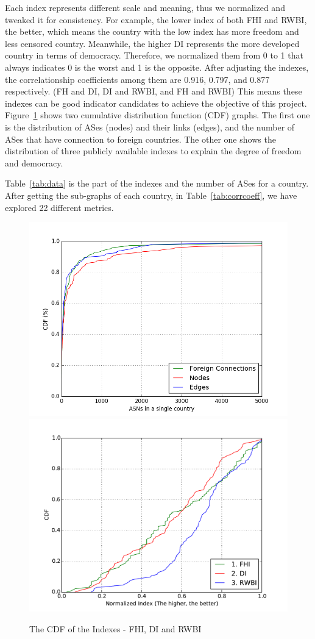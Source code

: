 \documentclass{article}
\begin{document}
\noindent 
Each index represents different scale and meaning, thus we normalized and
tweaked it for consistency. For example, the lower index of both FHI and RWBI,
the better, which means the country with the low index has more freedom and less
censored country. Meanwhile, the higher DI represents the more developed country
in terms of democracy. Therefore, we normalized them from 0 to 1 that always
indicates 0 is the worst and 1 is the opposite. After adjusting the indexes, the
correlationship coefficients among them are 0.916, 0.797, and 0.877
respectively. (FH and DI, DI and RWBI, and FH and RWBI) This means these indexes
can be good indicator candidates to achieve the objective of this project.
Figure~\ref{fig:index_cdf} shows two cumulative distribution function (CDF) graphs. 
The first one is the distribution of ASes (nodes) and their links (edges), and the number
of ASes that have connection to foreign countries. The other one shows the distribution
of three publicly available indexes to explain the degree of freedom and democracy.

\bigskip

\noindent
Table~\ref{tab:data} is the part of the indexes and the number of ASes for a 
country.  After getting the sub-graphs of each country, in Table~\ref{tab:corrcoeff},
we have explored 22 different metrics.

\begin{figure}[h]
\centering 
\includegraphics[width=0.8\columnwidth]{node_edge_foreign.png}
\includegraphics[width=0.8\columnwidth]{index_cdf.pdf}
\caption{The CDF of the Indexes - FHI, DI and RWBI}
\label{fig:index_cdf}
\end{figure}
\end{document}
